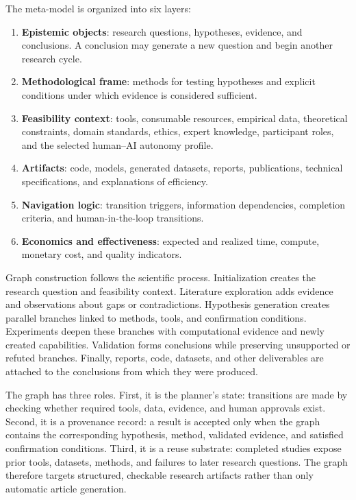 \documentclass[letterpaper]{article} %
\begin{document}
The meta-model is organized into six layers:
\begin{enumerate}
    \item \textbf{Epistemic objects}: research questions, hypotheses, evidence, and conclusions. A conclusion may generate a new question and begin another research cycle.
    \item \textbf{Methodological frame}: methods for testing hypotheses and explicit conditions under which evidence is considered sufficient.
    \item \textbf{Feasibility context}: tools, consumable resources, empirical data, theoretical constraints, domain standards, ethics, expert knowledge, participant roles, and the selected human--AI autonomy profile.
    \item \textbf{Artifacts}: code, models, generated datasets, reports, publications, technical specifications, and explanations of efficiency.
    \item \textbf{Navigation logic}: transition triggers, information dependencies, completion criteria, and human-in-the-loop transitions.
    \item \textbf{Economics and effectiveness}: expected and realized time, compute, monetary cost, and quality indicators.
\end{enumerate}

Graph construction follows the scientific process. Initialization creates the research question and feasibility context. Literature exploration adds evidence and observations about gaps or contradictions. Hypothesis generation creates parallel branches linked to methods, tools, and confirmation conditions. Experiments deepen these branches with computational evidence and newly created capabilities. Validation forms conclusions while preserving unsupported or refuted branches. Finally, reports, code, datasets, and other deliverables are attached to the conclusions from which they were produced.

The graph has three roles. First, it is the planner's state: transitions are made by checking whether required tools, data, evidence, and human approvals exist. Second, it is a provenance record: a result is accepted only when the graph contains the corresponding hypothesis, method, validated evidence, and satisfied confirmation conditions. Third, it is a reuse substrate: completed studies expose prior tools, datasets, methods, and failures to later research questions. The graph therefore targets structured, checkable research artifacts rather than only automatic article generation.
\end{document}
